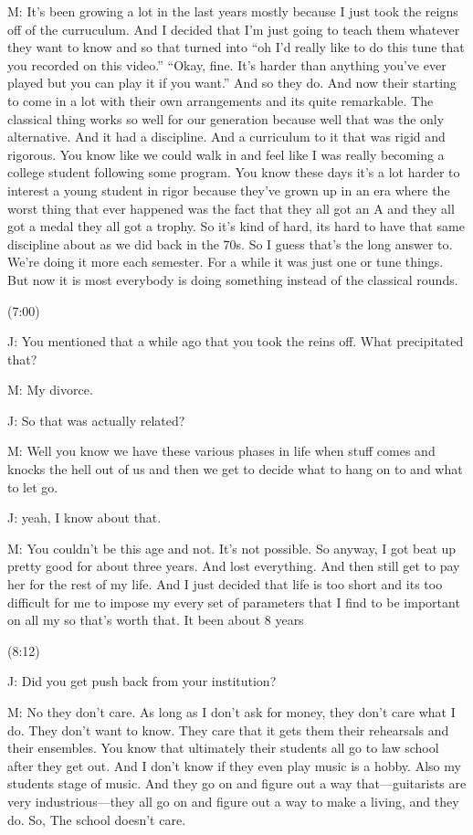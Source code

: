 \documentclass[11pt]{article}
\begin{document}
M: It's been growing a lot in the last years mostly because I just took the reigns off of the curruculum. And I decided that I'm just going to teach them whatever they want to know and so that turned into ``oh I'd really like to do this tune that you recorded on this video.'' ``Okay, fine. It's harder than anything you've ever played but you can play it if you want.'' And so they do. And now their starting to come in a lot with their own arrangements and its quite remarkable. The classical thing works so well for our generation because well that was the only alternative. And it had a discipline. And a curriculum to it that was rigid and rigorous. You know like we could walk in and feel like I was really becoming a college student following some program. You know these days it's a lot harder to interest a young student in rigor because they've grown up in an era where the worst thing that ever happened was the fact that they all got an A and they all got a medal they all got a trophy. So it's kind of hard, its hard to have that same discipline about as we did back in the 70s. So I guess that's the long answer to. We're doing it more each semester. For a while it was just one or tune things. But now it is most everybody is doing something instead of the classical rounds. 

(7:00)

J: You mentioned that a while ago that you took the reins off. What precipitated that?

M: My divorce.

J: So that was actually related?

M: Well you know we have these various phases in life when stuff comes and knocks the hell out of us and then we get to decide what to hang on to and what to let go.

J: yeah, I know about that.

M: You couldn't be this age and not. It's not possible. So anyway, I got beat up pretty good for about three years. And lost everything. And then still get to pay her for the rest of my life. And I just decided that life is too short and its too difficult for me to impose my every set of parameters that I find to be important on all my so that's worth that. It been about 8 years

(8:12)

J: Did you get push back from your institution?

M: No they don't care. As long as I don't ask for money, they don't care what I do. They don't want to know. They care that it gets them their rehearsals and their ensembles. You know that ultimately their students all go to law school after they get out. And I don't know if they even play music is a hobby. Also my students stage of music. And they go on and figure out a way that---guitarists are very industrious---they all go on and figure out a way to make a living, and they do. So, The school doesn't care.
\end{document}
